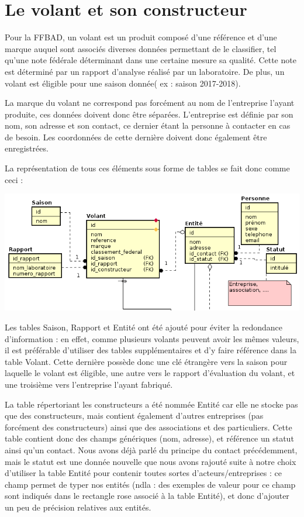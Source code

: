 \documentclass[french,a4paper,12pt]{report}
\begin{document}
\section{Le volant et son constructeur}
Pour la FFBAD, un volant est un produit composé d'une référence et d'une marque
auquel sont associés diverses données permettant de le classifier, tel qu'une
note fédérale déterminant dans une certaine mesure sa qualité. Cette note est déterminé
par un rapport d'analyse réalisé par un laboratoire. De plus, un volant est
éligible pour une saison donnée( ex : saison 2017-2018).

La marque du volant ne correspond pas forcément au nom de l'entreprise l'ayant
produite, ces données doivent donc être séparées. L'entreprise est définie par
son nom, son adresse et son contact, ce dernier étant la personne à contacter
en cas de besoin. Les coordonnées de cette dernière doivent donc également être
 enregistrées.

La représentation de tous ces éléments sous forme de tables se fait donc comme
ceci :

\includegraphics[width=15cm]{ensemble1.png}

Les tables Saison, Rapport et Entité ont été ajouté pour éviter la redondance
d'information : en effet, comme plusieurs volants peuvent avoir les mêmes
valeurs, il est préférable d'utiliser des tables supplémentaires et d'y faire
référence dans la table Volant. Cette dernière possède donc une clé étrangère
vers la saison pour laquelle le volant est éligible, une autre vers le rapport
d'évaluation du volant, et une troisième vers l'entreprise l'ayant fabriqué.

La table répertoriant les constructeurs a été nommée Entité car elle ne stocke
pas que des constructeurs, mais contient également d'autres entreprises (pas
forcément des constructeurs) ainsi que des associations et des particuliers.
Cette table contient donc des champs génériques (nom, adresse), et référence un
 statut ainsi qu'un contact. Nous avons déjà parlé du principe du contact
 précédemment, mais le statut est une donnée nouvelle que nous avons rajouté
 suite à notre choix d'utiliser la table Entité pour contenir toutes sortes
 d'acteurs/entreprises : ce champ permet de typer nos entités (ndla : des
 exemples de valeur pour ce champ sont indiqués dans le rectangle rose associé
 à la table Entité), et donc d'ajouter un peu de précision relatives aux entités.
\end{document}
